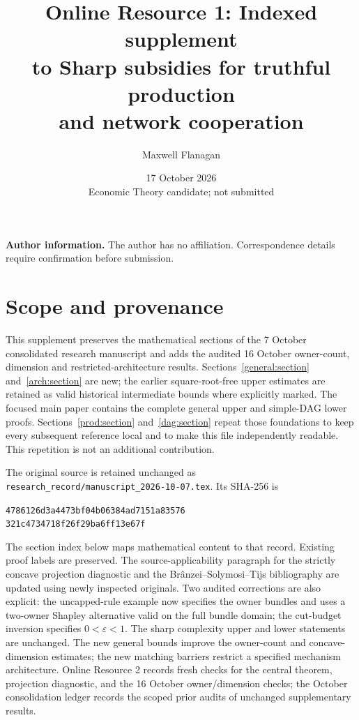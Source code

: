 \documentclass[11pt]{article}
\title{Online Resource 1: Indexed supplement\\to Sharp subsidies for truthful production\\and network cooperation}
\author{Maxwell Flanagan}
\date{17 October 2026\\[2pt]\small Economic Theory candidate; not submitted}
\theoremstyle{definition}\newtheorem{definition}[theorem]{Definition}
\theoremstyle{remark}\newtheorem{remark}[theorem]{Remark}
\begin{document}
\maketitle
\noindent\textbf{Author information.} The author has no affiliation.
Correspondence details require confirmation before submission.

\section*{Scope and provenance}
This supplement preserves the mathematical sections of the 7 October
consolidated research manuscript and adds the audited 16 October owner-count,
dimension and restricted-architecture results. Sections~\ref{general:section}
and~\ref{arch:section} are new; the earlier square-root-free upper estimates
are retained as valid historical intermediate bounds where explicitly marked. The focused main paper contains the complete
general upper and simple-DAG lower proofs. Sections~\ref{prod:section}
and~\ref{dag:section} repeat those foundations to keep every subsequent
reference local and to make this file independently readable. This repetition
is not an additional contribution.

The original source is retained unchanged as
\texttt{research\_record/manuscript\_2026-10-07.tex}. Its SHA-256 is
\begin{center}\small\texttt{4786126d3a4473bf04b06384ad7151a83576}\\
\texttt{321c4734718f26f29ba6ff13e67f}\end{center}
The section index below maps mathematical content to that record. Existing
proof labels are preserved. The source-applicability paragraph for the strictly
concave projection diagnostic and the Br\^anzei--Solymosi--Tijs bibliography
are updated using newly inspected originals. Two audited corrections are
also explicit: the uncapped-rule example now specifies the owner bundles
and uses a two-owner Shapley alternative valid on the full bundle domain;
the cut-budget inversion specifies $0<\varepsilon<1$. The sharp complexity upper and lower statements are unchanged. The new
general bounds improve the owner-count and concave-dimension estimates;
the new matching barriers restrict a specified mechanism architecture. Online Resource 2 records fresh checks for the
central theorem, projection diagnostic, and the 16 October owner/dimension
checks; the October consolidation ledger
records the scoped prior audits of unchanged supplementary results.
\end{document}
